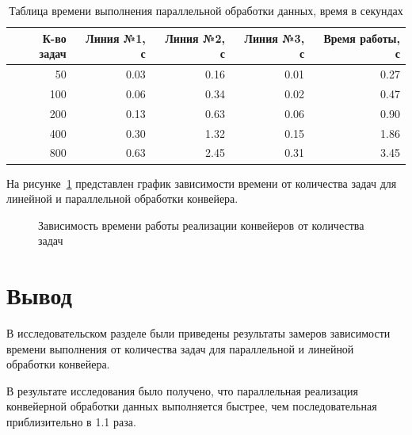\begin{table} [h!]
	\caption{Таблица времени выполнения параллельной обработки данных, время в секундах}
	\label{tab01}
	\begin{tabular}{|r|r|r|r|r|}
		\hline
		К-во задач & Линия №1, с & Линия №2, с & Линия №3, с & Время работы, с\\
		\hline
		50 & 0.03 & 0.16 & 0.01 & 0.27 \\
		\hline
		100 & 0.06 & 0.34 & 0.02 & 0.47 \\
		\hline
		200 & 0.13 & 0.63 & 0.06 & 0.90 \\
		\hline
		400 & 0.30 & 1.32 & 0.15 & 1.86 \\
		\hline
		800 & 0.63  & 2.45 & 0.31 & 3.45 \\
		\hline
	\end{tabular}
\end{table}
\newpage

На рисунке~\ref{fig:linear-vs-parallel} представлен график зависимости времени от количества задач для линейной и параллельной обработки конвейера.

\begin{figure}[h!]
	\centering
	\captionsetup{justification=centering}
	\caption{Зависимость времени работы реализации конвейеров от количества задач}
	\label{fig:linear-vs-parallel}
\end{figure}

\section{Вывод}

В исследовательском разделе были приведены результаты замеров зависимости времени выполнения от количества задач для параллельной и линейной обработки конвейера.

В результате исследования было получено, что параллельная реализация конвейерной обработки данных выполняется быстрее,
чем последовательная приблизительно в 1.1 раза.